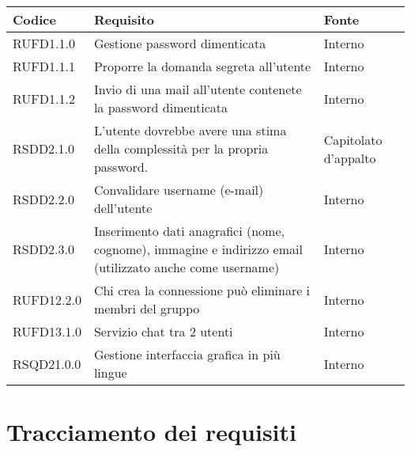 \begin{longtable}{lp{}l}
\toprule Codice & Requisito & Fonte\\
\midrule
RUFD1.1.0 & Gestione password dimenticata & Interno \\
RUFD1.1.1 & Proporre la domanda segreta all'utente & Interno \\
RUFD1.1.2 & Invio di una mail all'utente contenete la password dimenticata & Interno \\
RSDD2.1.0 & L'utente dovrebbe avere una stima della complessità per la propria password. & Capitolato d'appalto \\
RSDD2.2.0 & Convalidare username (e-mail) dell'utente & Interno \\
RSDD2.3.0 & Inserimento dati anagrafici (nome, cognome), immagine e indirizzo email (utilizzato anche come username) & Interno \\
RUFD12.2.0 & Chi crea la connessione può eliminare i membri del gruppo & Interno \\
RUFD13.1.0 & Servizio chat tra 2 utenti & Interno \\
RSQD21.0.0 & Gestione interfaccia grafica in più lingue & Interno \\
\bottomrule
\end{longtable}
\newpage\section{Tracciamento dei requisiti}\label{sec:tracciamento}

